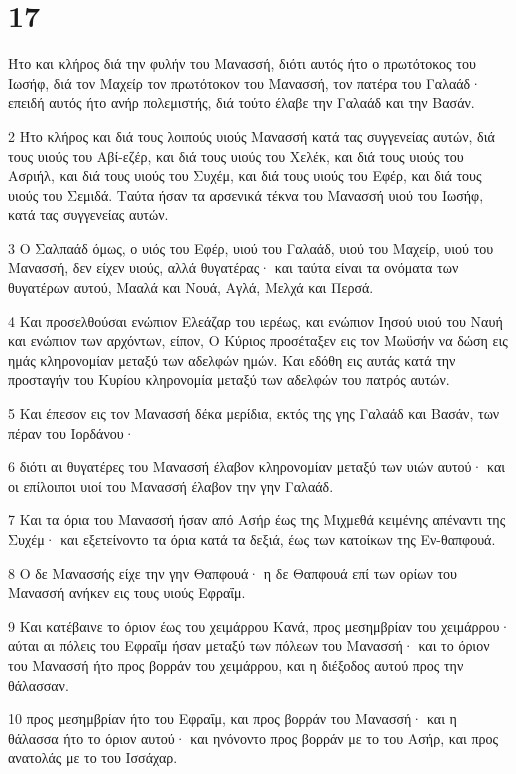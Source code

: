 \chapter{17}

\par Ήτο και κλήρος διά την φυλήν του Μανασσή, διότι αυτός ήτο ο πρωτότοκος του Ιωσήφ, διά τον Μαχείρ τον πρωτότοκον του Μανασσή, τον πατέρα του Γαλαάδ· επειδή αυτός ήτο ανήρ πολεμιστής, διά τούτο έλαβε την Γαλαάδ και την Βασάν.
\par 2 Ήτο κλήρος και διά τους λοιπούς υιούς Μανασσή κατά τας συγγενείας αυτών, διά τους υιούς του Αβί-εζέρ, και διά τους υιούς του Χελέκ, και διά τους υιούς του Ασριήλ, και διά τους υιούς του Συχέμ, και διά τους υιούς του Εφέρ, και διά τους υιούς του Σεμιδά. Ταύτα ήσαν τα αρσενικά τέκνα του Μανασσή υιού του Ιωσήφ, κατά τας συγγενείας αυτών.
\par 3 Ο Σαλπαάδ όμως, ο υιός του Εφέρ, υιού του Γαλαάδ, υιού του Μαχείρ, υιού του Μανασσή, δεν είχεν υιούς, αλλά θυγατέρας· και ταύτα είναι τα ονόματα των θυγατέρων αυτού, Μααλά και Νουά, Αγλά, Μελχά και Περσά.
\par 4 Και προσελθούσαι ενώπιον Ελεάζαρ του ιερέως, και ενώπιον Ιησού υιού του Ναυή και ενώπιον των αρχόντων, είπον, Ο Κύριος προσέταξεν εις τον Μωϋσήν να δώση εις ημάς κληρονομίαν μεταξύ των αδελφών ημών. Και εδόθη εις αυτάς κατά την προσταγήν του Κυρίου κληρονομία μεταξύ των αδελφών του πατρός αυτών.
\par 5 Και έπεσον εις τον Μανασσή δέκα μερίδια, εκτός της γης Γαλαάδ και Βασάν, των πέραν του Ιορδάνου·
\par 6 διότι αι θυγατέρες του Μανασσή έλαβον κληρονομίαν μεταξύ των υιών αυτού· και οι επίλοιποι υιοί του Μανασσή έλαβον την γην Γαλαάδ.
\par 7 Και τα όρια του Μανασσή ήσαν από Ασήρ έως της Μιχμεθά κειμένης απέναντι της Συχέμ· και εξετείνοντο τα όρια κατά τα δεξιά, έως των κατοίκων της Εν-θαπφουά.
\par 8 Ο δε Μανασσής είχε την γην Θαπφουά· η δε Θαπφουά επί των ορίων του Μανασσή ανήκεν εις τους υιούς Εφραΐμ.
\par 9 Και κατέβαινε το όριον έως του χειμάρρου Κανά, προς μεσημβρίαν του χειμάρρου· αύται αι πόλεις του Εφραΐμ ήσαν μεταξύ των πόλεων του Μανασσή· και το όριον του Μανασσή ήτο προς βορράν του χειμάρρου, και η διέξοδος αυτού προς την θάλασσαν.
\par 10 προς μεσημβρίαν ήτο του Εφραΐμ, και προς βορράν του Μανασσή· και η θάλασσα ήτο το όριον αυτού· και ηνόνοντο προς βορράν με το του Ασήρ, και προς ανατολάς με το του Ισσάχαρ.
